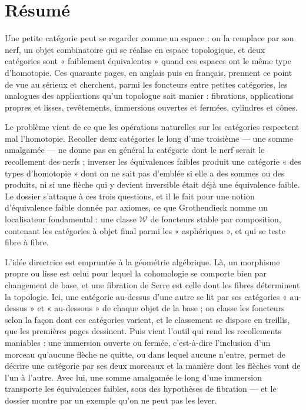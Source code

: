 \documentclass[11pt,a4paper]{article}
\begin{document}
\section*{Résumé}

\begin{resume}
Une petite catégorie peut se regarder comme un espace : on la remplace par son
nerf, un objet combinatoire qui se réalise en espace topologique, et deux
catégories sont « faiblement équivalentes » quand ces espaces ont le même type
d'homotopie. Ces quarante pages, en anglais puis en français, prennent ce point
de vue au sérieux et cherchent, parmi les foncteurs entre petites catégories,
les analogues des applications qu'un topologue sait manier : fibrations,
applications propres et lisses, revêtements, immersions ouvertes et fermées,
cylindres et cônes.

Le problème vient de ce que les opérations naturelles sur les catégories
respectent mal l'homotopie. Recoller deux catégories le long d'une troisième
--- une somme amalgamée --- ne donne pas en général la catégorie dont le nerf
serait le recollement des nerfs ; inverser les équivalences faibles produit une
catégorie « des types d'homotopie » dont on ne sait pas d'emblée si elle a des
sommes ou des produits, ni si une flèche qui y devient inversible était déjà
une équivalence faible. Le dossier s'attaque à ces trois questions, et il le
fait pour une notion d'équivalence faible donnée par axiomes, ce que
Grothendieck nomme un localisateur fondamental : une classe $\mathcal{W}$ de
foncteurs stable par composition, contenant les catégories à objet final
parmi les « asphériques », et qui se teste fibre à fibre.

L'idée directrice est empruntée à la géométrie algébrique. Là, un morphisme
propre ou lisse est celui pour lequel la cohomologie se comporte bien par
changement de base, et une fibration de Serre est celle dont les fibres
déterminent la topologie. Ici, une catégorie au-dessus d'une autre se lit par
ses catégories « au-dessus » et « au-dessous » de chaque objet de la base ; on
classe les foncteurs selon la façon dont ces catégories varient, et le
classement se dispose en treillis, que les premières pages dessinent. Puis
vient l'outil qui rend les recollements maniables : une immersion ouverte ou
fermée, c'est-à-dire l'inclusion d'un morceau qu'aucune flèche ne quitte, ou
dans lequel aucune n'entre, permet de décrire une catégorie par ses deux
morceaux et la manière dont les flèches vont de l'un à l'autre. Avec lui, une
somme amalgamée le long d'une immersion transporte les équivalences faibles,
sous des hypothèses de fibration --- et le dossier montre par un exemple qu'on
ne peut pas les lever.


\end{resume}
\end{document}
